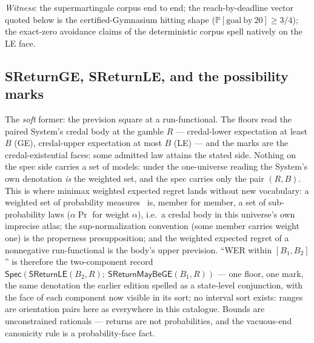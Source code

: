 \emph{Witness}: the supermartingale corpus end to end; the
reach-by-deadline vector quoted below is the certified-Gymnasium
hitting shape ($\mathbb{P}[\mathrm{goal\ by\ }20] \ge 3/4$); the
exact-zero avoidance claims of the deterministic corpus spell
natively on the LE face.



\subsection{SReturnGE, SReturnLE, and the possibility marks}
\label{sec:spec-lang-return}


The \emph{soft} former: the prevision square at a run-functional. The floors
read the paired System's credal body at the gamble $R$ ---
credal-lower expectation at least $B$ (\textsc{GE}), credal-upper
expectation at most $B$ (\textsc{LE}) --- and the marks are the
credal-existential faces: some admitted law attains the stated side.
Nothing on the spec side carries a set of models: under the
one-universe reading the System's own denotation \emph{is} the
weighted set, and the spec carries only the pair $(R, B)$. This is
where minimax weighted expected regret lands without new vocabulary:
a weighted set of probability measures~\cite{halpern13} is, member
for member, a set of sub-probability laws ($\alpha\Pr$ for weight
$\alpha$), i.e.\ a credal body in this universe's own imprecise
atlas; the sup-normalization convention (some member carries weight
one) is the properness presupposition; and the weighted expected
regret of a nonnegative run-functional is the body's upper
prevision. ``WER
within $[B_1, B_2]$'' is therefore the two-component record
$\mathsf{Spec}(\mathsf{SReturnLE}(B_2, R);\
\mathsf{SReturnMayBeGE}(B_1, R))$
--- one floor, one mark, the same denotation the earlier edition
spelled as a state-level conjunction, with the face of each
component now visible in its sort; no interval sort exists:
ranges are orientation pairs here as everywhere in this catalogue.
Bounds are unconstrained rationals --- returns are not
probabilities, and the vacuous-end canonicity rule is a
probability-face fact.

